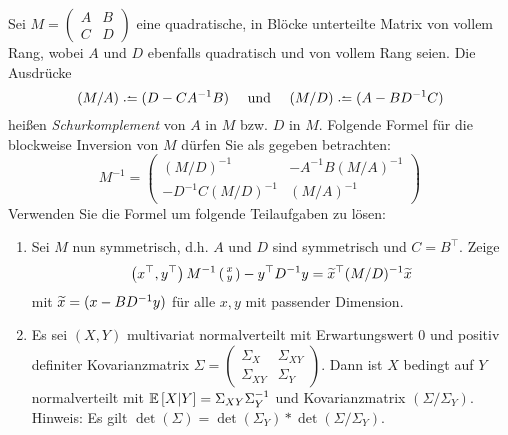 \begin{exercisePage}
	\begin{task}
		Sei $M = \left(\begin{smallmatrix} A & B \\ C & D \end{smallmatrix} \right)$ eine quadratische, in Blöcke unterteilte Matrix von vollem Rang, wobei $A$ und $D$ ebenfalls quadratisch und von vollem Rang seien. Die Ausdrücke
		\begin{equation*}
			(M/A) \defeq (D - CA^{-1} B) \quad \und \quad (M/D) \defeq (A - BD^{-1} C)
		\end{equation*}
		heißen \textit{Schurkomplement} von $A$ in $M$ bzw. $D$ in $M$. Folgende Formel für die blockweise Inversion von $M$ dürfen Sie als gegeben betrachten:
		\begin{equation*}
			M^{-1} = \begin{pmatrix}
				(M/D)^{-1} & -A^{-1}B(M/A)^{-1} \\
				-D^{-1}C(M/D)^{-1} & (M/A)^{-1}
			\end{pmatrix}
		\end{equation*}
		Verwenden Sie die Formel um folgende Teilaufgaben zu lösen:
		\begin{enumerate}[label=(\alph*)]
			\item \label{it: ue1-aufgabe3a}
			Sei $M$ nun symmetrisch, d.h. $A$ und $D$ sind symmetrisch und $C = B^\top$. Zeige
			\begin{equation*}
				\left( x^\top, y^\top \right) M^{-1} \left(\begin{smallmatrix} x \\ y \end{smallmatrix}\right) - y^\top D^{-1} y 
				=
				\widetilde{x}^\top (M/D)^{-1} \widetilde{x}
			\end{equation*}
			mit $\widetilde{x} = (x - BD^{-1}y)$ für alle $x,y$ mit passender Dimension.
			\item Es sei $(X,Y)$ multivariat normalverteilt mit Erwartungswert $0$ und positiv definiter Kovarianzmatrix $\Sigma = \left(\begin{smallmatrix} \Sigma_X & \Sigma_{XY} \\ \Sigma_{XY} & \Sigma_Y \end{smallmatrix}\right)$. Dann ist $X$ bedingt auf $Y$ normalverteilt mit $\mathbb{E} \left[ X|Y \right] = \Sigma_{XY}\Sigma_Y^{-1}$ und Kovarianzmatrix $(\Sigma/\Sigma_Y)$. \\
			Hinweis: Es gilt $\det(\Sigma) = \det(\Sigma_Y) * \det(\Sigma/\Sigma_Y)$.
		\end{enumerate}
	\end{task}


\end{exercisePage}
